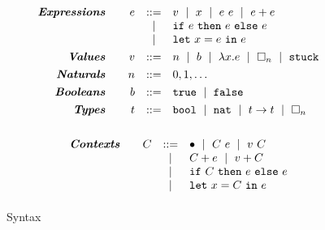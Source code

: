 \begin{figure}
$$
\begin{array}{rrcl}
\emphbf{Expressions} \quad 
  & e & ::=    & v \spmid x \spmid \eapp{e}{e} \spmid \eplus{e}{e}\\
  &   & \spmid & \eif{e}{e}{e} \\
  &   & \spmid & \elet{x}{e}{e} \\[0.05in] 

\emphbf{Values} \quad 
  & v & ::= &  n \spmid b \spmid \efun{x}{e} \spmid \ehole{n} \spmid \stuck \\[0.05in] 

\emphbf{Naturals} \quad
  & n & ::= &  0,1,\ldots \\[0.05in]

\emphbf{Booleans} \quad
  & b & ::= &  \etrue \spmid \efalse \\[0.05in]

\emphbf{Types} \quad 
  & t & ::= & \tbool \spmid \tnat \spmid \tfun{t}{t} \spmid \thole{n} \\[0.1in]
\end{array}
$$

$$
\begin{array}{rrcl}
\textbf{\emph{Contexts}} \quad 
  & C
  & ::= 
  &   	 \bullet 
  \ \mid \  C \ e
  \ \mid \  v \ C \\
  & & \ \mid \  & C + e \ \mid \  v + C \\
  & & \ \mid \  & \mathtt{if}\ C\ \mathtt{then}\ e\ \mathtt{else}\ e \\
  & & \ \mid \  & \mathtt{let}\ x = C\ \mathtt{in}\ e
  \\[0.05in] 
\end{array}
$$



\caption{Syntax}
\label{fig:syntax}
\end{figure}

